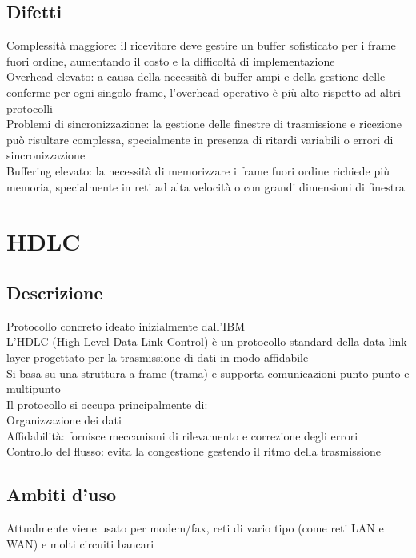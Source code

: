 \documentclass[10pt,oneside,a4paper]{article}
\begin{document}
\subsection{Difetti}
Complessità maggiore: il ricevitore deve gestire un buffer sofisticato per i frame fuori ordine, aumentando il costo e la difficoltà di implementazione\\
Overhead elevato: a causa della necessità di buffer ampi e della gestione delle conferme per ogni singolo frame, l'overhead operativo è più alto rispetto ad altri protocolli\\
Problemi di sincronizzazione: la gestione delle finestre di trasmissione e ricezione può risultare complessa, specialmente in presenza di ritardi variabili o errori di sincronizzazione\\
Buffering elevato: la necessità di memorizzare i frame fuori ordine richiede più memoria, specialmente in reti ad alta velocità o con grandi dimensioni di finestra
\section{HDLC}
\subsection{Descrizione}
Protocollo concreto ideato inizialmente dall'IBM\\
L'HDLC (High-Level Data Link Control) è un protocollo standard della data link layer progettato per la trasmissione di dati in modo affidabile\\
Si basa su una struttura a frame (trama) e supporta comunicazioni punto-punto e multipunto\\
Il protocollo si occupa principalmente di:\\
Organizzazione dei dati\\
Affidabilità: fornisce meccanismi di rilevamento e correzione degli errori\\
Controllo del flusso: evita la congestione gestendo il ritmo della trasmissione
\subsection{Ambiti d'uso}
Attualmente viene usato per modem/fax, reti di vario tipo (come reti LAN  e WAN) e molti circuiti bancari
\end{document}
